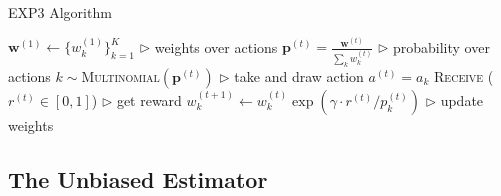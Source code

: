\documentclass[11pt]{article}
\begin{document}
\begin{algorithm}[H]
\caption{EXP3 Algorithm}
\label{algo:exp3}
\begin{algorithmic}[1]
\State $\pmb{w}^{(1)} \leftarrow \{w_k^{(1)} \}_{k=1}^{K}$ \hfill $\triangleright$ weights over actions
\State $\pmb{p}^{(t)} = \frac{\pmb{w}^{(t)}}{\sum_k w_k^{(t)}}$ \hfill $\triangleright$ probability over actions
\State $k \sim $\textsc{Multinomial}$(\pmb{p}^{(t)})$ \hfill $\triangleright$ take and draw action
\State $a^{(t)}=a_k$
\State \textsc{Receive} ($r^{(t)}\in [0, 1]$) \hfill $\triangleright$ get reward
\State $w_{k}^{(t+1)}\leftarrow w_{k}^{(t)} \exp{(\gamma \cdot r^{(t)}/p_k^{(t)})}$ \hfill $\triangleright$ update weights
\EndFor
\EndFunction
\end{algorithmic}
\end{algorithm}


\subsection{The Unbiased Estimator}
\end{document}
